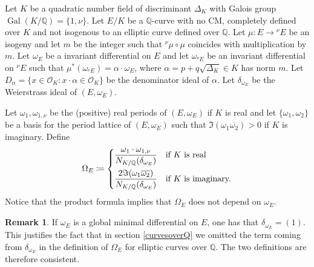 \documentclass[11pt]{amsart}
\theoremstyle{definition}
\newtheorem{rmk}[definizione]{Remark}
\begin{document}
		Let $K$ be a quadratic number field of discriminant $\Delta_K$ with Galois group $\operatorname{Gal}(K/{\mathbb{Q}})=\{1,\nu\}$. Let $E/K$ be a ${\mathbb{Q}}$-curve with no CM, completely defined over $K$ and not isogenous to an elliptic curve defined over ${\mathbb{Q}}$. Let $\mu\colon E\to {{}^\nu\!} E$ be an isogeny and let $m$ be the integer such that ${{}^\nu\!}\mu\circ \mu$ coincides with multiplication by $m$. Let $\omega_E$ be a invariant differential on $E$ and let $\omega_{{{}^\nu\!} E}$ be an invariant differential on ${{}^\nu\!} E$ such that $\mu^*(\omega_{{{}^\nu\!} E})=\alpha\cdot\omega_E$, where $\alpha=p+q\sqrt{\Delta_K}\in K$ has norm $m$. Let $D_{\alpha}=\{x\in {\mathcal{O}}_K\colon x\cdot \alpha\in {\mathcal{O}}_K\}$ be the denominator ideal of $\alpha$. Let $\delta_{\omega_E}$ be the Weierstrass ideal of $(E,\omega_E)$.
		
		Let $\omega_1,\omega_{1,\nu}$ be the (positive) real periods of $(E,\omega_E)$ if $K$ is real and let $\{\omega_1,\omega_2\}$ be a basis for the period lattice of $(E,\omega_E)$ such that $\Im(\omega_1\overline{\omega_2})>0$ if $K$ is imaginary. Define
		$$\Omega_E\coloneqq\begin{dcases}\frac{\omega_1\cdot\omega_{1,\nu}}{N_{K/{\mathbb{Q}}}(\delta_{\omega_E})} & \mbox{if $K$ is real}\\ \frac{2\Im(\omega_1\overline{\omega_2})}{N_{K/{\mathbb{Q}}}(\delta_{\omega_E})} & \mbox{if $K$ is imaginary.} \end{dcases}$$
		Notice that the product formula implies that $\Omega_E$ does not depend on $\omega_E$.
		\begin{rmk}
			If $\omega_E$ is a global minimal differential on $E$, one has that $\delta_{\omega_E}=(1)$. This justifies the fact that in section \ref{curvesoverQ} we omitted the term coming from $\delta_{\omega_E}$ in the definition of $\Omega_E$ for elliptic curves over ${\mathbb{Q}}$. The two definitions are therefore consistent.
		\end{rmk}
\end{document}
